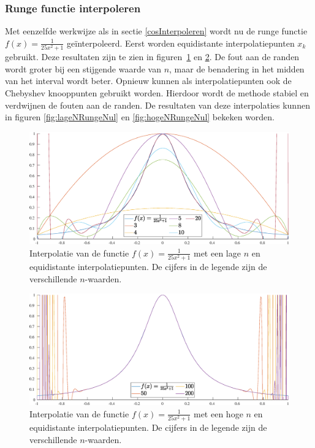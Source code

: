 \documentclass[a4paper, 12pt, titlepage, fleqn]{article}
\begin{document}
\newpage
\subsubsection{Runge functie interpoleren}
Met eenzelfde werkwijze als in sectie \ref{cosInterpoleren} wordt nu de runge functie $f(x) = \frac{1}{25x^2+1}$ ge\"interpoleerd. Eerst worden equidistante interpolatiepunten $x_k$ gebruikt. Deze resultaten zijn te zien in figuren~\ref{fig:lageNRungeEqui} en \ref{fig:hogeNRungeEqui}. De fout aan de randen wordt groter bij een stijgende waarde van $n$, maar de benadering in het midden van het interval wordt beter.  Opnieuw kunnen als interpolatiepunten ook de Chebyshev knooppunten gebruikt worden. Hierdoor wordt de methode stabiel en verdwijnen de fouten aan de randen. De resultaten van deze interpolaties kunnen in figuren \ref{fig:lageNRungeNul} en \ref{fig:hogeNRungeNul} bekeken worden.

\begin{figure}
\centering
\includegraphics[scale=0.4]{../Afbeeldingen/runge_equi_laag.eps}
\caption[Runge interpolatie, weinig equidistante interpolatiepunten]{Interpolatie van de functie $f(x) = \frac{1}{25x^2+1}$ met een lage $n$ en equidistante interpolatiepunten. De cijfers in de legende zijn de verschillende $n$-waarden.}
\label{fig:lageNRungeEqui}
\end{figure}

\begin{figure}
\centering
\includegraphics[scale=0.4]{../Afbeeldingen/runge_equi_hoog.eps}
\caption[Ruunge interpolatie, veel equidistante interpolatiepunten ]{Interpolatie van de functie $f(x) = \frac{1}{25x^2+1}$ met een hoge $n$ en equidistante interpolatiepunten. De cijfers in de legende zijn de verschillende $n$-waarden.}
\label{fig:hogeNRungeEqui}
\end{figure}
\end{document}
